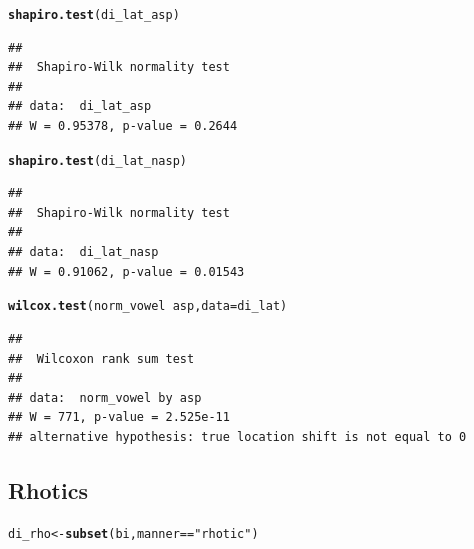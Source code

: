 \documentclass[a4paper,11pt]{article}\usepackage[]{graphicx}\usepackage[]{color}
\makeatletter
\newcommand{\hlstr}[1]{\textcolor[rgb]{0.192,0.494,0.8}{#1}}%
\newcommand{\hlopt}[1]{\textcolor[rgb]{0,0,0}{#1}}%
\newcommand{\hlstd}[1]{\textcolor[rgb]{0.345,0.345,0.345}{#1}}%
\newcommand{\hlkwb}[1]{\textcolor[rgb]{0.69,0.353,0.396}{#1}}%
\newcommand{\hlkwc}[1]{\textcolor[rgb]{0.333,0.667,0.333}{#1}}%
\newcommand{\hlkwd}[1]{\textcolor[rgb]{0.737,0.353,0.396}{\textbf{#1}}}%
\newenvironment{kframe}{%
 \def\at@end@of@kframe{}%
 \ifinner\ifhmode%
  \def\at@end@of@kframe{\end{minipage}}%
  \begin{minipage}{\columnwidth}%
 \fi\fi%
 \def\FrameCommand##1{\hskip\@totalleftmargin \hskip-\fboxsep
 \colorbox{shadecolor}{##1}\hskip-\fboxsep
     \hskip-\linewidth \hskip-\@totalleftmargin \hskip\columnwidth}%
 \MakeFramed {\advance\hsize-\width
   \@totalleftmargin\z@ \linewidth\hsize
   \@setminipage}}%
 {\par\unskip\endMakeFramed%
 \at@end@of@kframe}
\newenvironment{knitrout}{}{} %
\makeatother
\begin{document}
\begin{knitrout}
\color{fgcolor}\begin{kframe}
\begin{alltt}
\hlkwd{shapiro.test}\hlstd{(di_lat_asp)}
\end{alltt}
\begin{verbatim}
## 
## 	Shapiro-Wilk normality test
## 
## data:  di_lat_asp
## W = 0.95378, p-value = 0.2644
\end{verbatim}
\begin{alltt}
\hlkwd{shapiro.test}\hlstd{(di_lat_nasp)}
\end{alltt}
\begin{verbatim}
## 
## 	Shapiro-Wilk normality test
## 
## data:  di_lat_nasp
## W = 0.91062, p-value = 0.01543
\end{verbatim}
\begin{alltt}
\hlkwd{wilcox.test}\hlstd{(norm_vowel} \hlopt{~} \hlstd{asp,} \hlkwc{data} \hlstd{= di_lat)}
\end{alltt}
\begin{verbatim}
## 
## 	Wilcoxon rank sum test
## 
## data:  norm_vowel by asp
## W = 771, p-value = 2.525e-11
## alternative hypothesis: true location shift is not equal to 0
\end{verbatim}
\end{kframe}
\end{knitrout}

\subsection{Rhotics}

\begin{knitrout}
\color{fgcolor}\begin{kframe}
\begin{alltt}
\hlstd{di_rho} \hlkwb{<-} \hlkwd{subset}\hlstd{(bi, manner} \hlopt{==} \hlstr{"rhotic"}\hlstd{)}
\end{alltt}
\end{kframe}
\end{knitrout}
\end{document}
